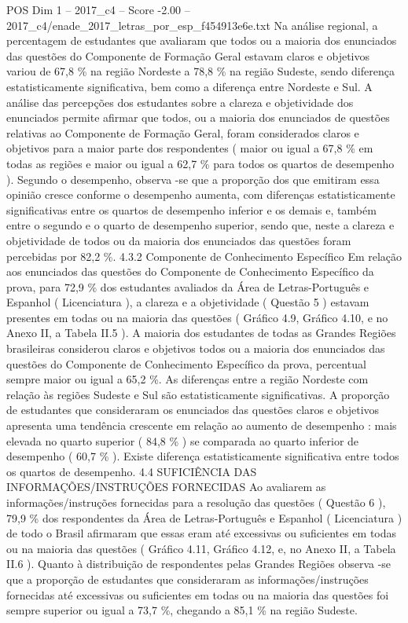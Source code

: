 \begin{textsample}{POS Dim 1 – 2017\_c4 – Score -2.00 – 2017\_c4/enade\_2017\_letras\_por\_esp\_f454913e6e.txt}
Na análise regional, a percentagem de estudantes que avaliaram que todos ou a maioria dos enunciados das questões do Componente de Formação Geral estavam claros e objetivos variou de 67,8 \% na região Nordeste a 78,8 \% na região Sudeste, sendo diferença estatisticamente significativa, bem como a diferença entre Nordeste e Sul.
A análise das percepções dos estudantes sobre a clareza e objetividade dos enunciados permite afirmar que todos, ou a maioria dos enunciados de questões relativas ao Componente de Formação Geral, foram considerados claros e objetivos para a maior parte dos respondentes ( maior ou igual a 67,8 \% em todas as regiões e maior ou igual a 62,7 \% para todos os quartos de desempenho ).
Segundo o desempenho, observa -se que a proporção dos que emitiram essa opinião cresce conforme o desempenho aumenta, com diferenças estatisticamente significativas entre os quartos de desempenho inferior e os demais e, também entre o segundo e o quarto de desempenho superior, sendo que, neste a clareza e objetividade de todos ou da maioria dos enunciados das questões foram percebidas por 82,2 \%. 4.3.2 Componente de Conhecimento Específico Em relação aos enunciados das questões do Componente de Conhecimento Específico da prova, para 72,9 \% dos estudantes avaliados da Área de Letras-Português e Espanhol ( Licenciatura ), a clareza e a objetividade ( Questão 5 ) estavam presentes em todas ou na maioria das questões ( Gráfico 4.9, Gráfico 4.10, e no Anexo II, a Tabela II.5 ).
A maioria dos estudantes de todas as Grandes Regiões brasileiras considerou claros e objetivos todos ou a maioria dos enunciados das questões do Componente de Conhecimento Específico da prova, percentual sempre maior ou igual a 65,2 \%.
As diferenças entre a região Nordeste com relação às regiões Sudeste e Sul são estatisticamente significativas.
A proporção de estudantes que consideraram os enunciados das questões claros e objetivos apresenta uma tendência crescente em relação ao aumento de desempenho : mais elevada no quarto superior ( 84,8 \% ) se comparada ao quarto inferior de desempenho ( 60,7 \% ).
Existe diferença estatisticamente significativa entre todos os quartos de desempenho. 4.4 SUFICIÊNCIA DAS INFORMAÇÕES/INSTRUÇÕES FORNECIDAS Ao avaliarem as informações/instruções fornecidas para a resolução das questões ( Questão 6 ), 79,9 \% dos respondentes da Área de Letras-Português e Espanhol ( Licenciatura ) de todo o Brasil afirmaram que essas eram até excessivas ou suficientes em todas ou na maioria das questões ( Gráfico 4.11, Gráfico 4.12, e, no Anexo II, a Tabela II.6 ).
Quanto à distribuição de respondentes pelas Grandes Regiões observa -se que a proporção de estudantes que consideraram as informações/instruções fornecidas até excessivas ou suficientes em todas ou na maioria das questões foi sempre superior ou igual a 73,7 \%, chegando a 85,1 \% na região Sudeste.

\end{textsample}

